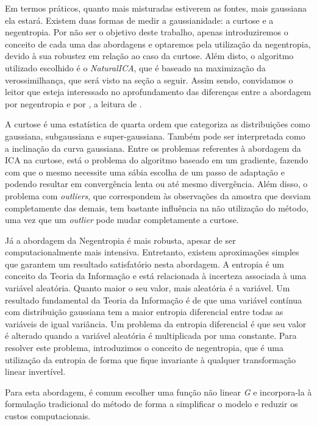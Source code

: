     \medskip
    
    Em termos práticos, quanto mais misturadas estiverem as fontes, mais gaussiana ela estará. Existem duas formas de medir a gaussianidade: a curtose e a negentropia. Por não ser o objetivo deste trabalho, apenas introduziremos o conceito de cada uma das abordagens e optaremos pela utilização da negentropia, devido à sua robustez em relação ao caso da curtose. Além disto, o algoritmo utilizado escolhido é o \textit{NaturalICA}, que é baseado na maximização da verossimilhança, que será visto na seção a seguir. Assim sendo, convidamos o leitor que esteja interessado no aprofundamento das diferenças entre a abordagem por negentropia e por , a leitura de \cite{LuizVictorio}.
    
    A curtose é uma estatística de quarta ordem que categoriza as distribuições como gaussiana, subgaussiana e super-gaussiana. Também pode ser interpretada como a inclinação da curva gaussiana. Entre os problemas referentes à abordagem da ICA na curtose, está o problema do algoritmo baseado em um gradiente, fazendo com que o mesmo necessite uma sábia escolha de um passo de adaptação e podendo resultar em convergência lenta ou até mesmo divergência. Além disso, o problema com \textit{outliers}, que correspondem às observações da amostra que desviam completamente das demais, tem bastante influência na não utilização do método, uma vez que um \textit{outlier} pode mudar completamente a curtose.
    
    Já a abordagem da Negentropia é mais robusta, apesar de ser computacionalmente mais intensiva. Entretanto, existem aproximações simples que garantem um resultado satisfatório nesta abordagem. A entropia é um conceito da Teoria da Informação e está relacionada à incerteza associada à uma variável aleatória. Quanto maior o seu valor, mais aleatória é a variável. Um resultado fundamental da Teoria da Informação é de que uma variável contínua com distribuição gaussiana tem a maior entropia diferencial entre todas as variáveis de igual variância. Um problema da entropia diferencial é que seu valor é alterado quando a variável aleatória é multiplicada por uma constante. Para resolver este problema, introduzimos o conceito de negentropia, que é uma utilização da entropia de forma que fique invariante à qualquer transformação linear invertível. 
    
    Para esta abordagem, é comum escolher uma função não linear \textit{G} e incorpora-la à formulação tradicional do método de forma a simplificar o modelo e reduzir os custos computacionais.
    
